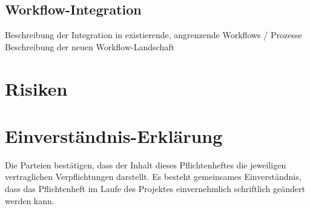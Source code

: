 \documentclass[
11pt,
a4paper,
ngerman,
]{article}
\newcommand{\descriptionWhat}[1]{%
	\begin{itshape}%
	#1 \\%
	\end{itshape}%
}
\begin{document}
\subsection{Workflow-Integration}

\descriptionWhat{Beschreibung der Integration in existierende, angrenzende Workflows / Prozesse
Beschreibung der neuen Workflow-Landschaft}

\newpage

\section{Risiken}


\newpage

\section{Einverständnis-Erklärung}

Die Parteien bestätigen, dass der Inhalt dieses Pflichtenheftes die jeweiligen vertraglichen Verpflichtungen darstellt. Es besteht gemeinsames Einverständnis, dass das Pflichtenheft im Laufe des Projektes einvernehmlich schriftlich geändert werden kann.
\end{document}

